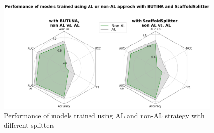 \documentclass[a4paper,10pt]{article}
\begin{document}
\begin{figure}
    \centering
    \includegraphics[keepaspectratio=true, scale=0.32]{images/splitters.png}
    \caption{Performance of models trained using AL and non-AL strategy with different splitters}
    \label{fig:4}
\end{figure}


\medskip



\end{document}
